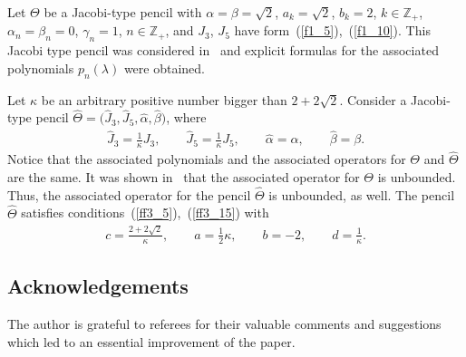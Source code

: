 \documentclass[pdftex]{sigma}
\numberwithin{equation}{section}
\begin{document}
\begin{Example}\label{ee3_1} Let $\Theta$ be a Jacobi-type pencil with $\alpha = \beta = \sqrt{2}$, $a_k = \sqrt{2}$, $b_k = 2$, $k\in\mathbb{Z}_+$, $\alpha_n = \beta_n = 0$, $\gamma_n = 1$, $n\in\mathbb{Z}_+$, and $J_3$, $J_5$ have form~(\ref{f1_5}),~(\ref{f1_10}). This Jacobi type pencil was considered in~\cite{cit_95000_Z} and explicit formulas for the associated polynomials $p_n(\lambda)$ were obtained.

Let $\kappa$ be an arbitrary positive number bigger than $2+2\sqrt{2}$. Consider a Jacobi-type pencil $\widehat\Theta = \big(\widehat J_3, \widehat J_5, \widehat \alpha, \widehat \beta\big)$, where
\begin{gather*} \widehat J_3 = \frac{1}{\kappa} J_3,\qquad \widehat J_5 = \frac{1}{\kappa} J_5,\qquad
\widehat\alpha = \alpha,\qquad \widehat\beta = \beta. \end{gather*}
Notice that the associated polynomials and the associated operators for $\Theta$ and $\widehat\Theta$ are the same. It was shown in~\cite{cit_95000_Z} that the associated operator for $\Theta$ is unbounded. Thus, the associated operator for the pencil $\widehat\Theta$ is unbounded, as well. The pencil $\widehat\Theta$ satisf\/ies conditions~(\ref{ff3_5}),~(\ref{ff3_15}) with
\begin{gather*} c= \frac{2+2\sqrt{2}}{\kappa},\qquad a = \frac{1}{2}\kappa,\qquad b = -2,\qquad d=\frac{1}{\kappa}. \end{gather*}
\end{Example}

\subsection*{Acknowledgements}
The author is grateful to referees for their valuable comments and suggestions which led to an essential improvement of the paper.
\end{document}
